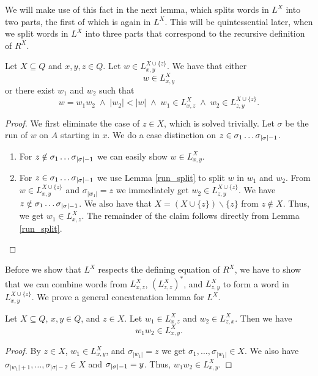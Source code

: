 
We will make use of this fact in the next lemma, which splits words in $L^{X}$ into two parts,
the first of which is again in $L^{X}$. 
This will be quintessential later, when we split words in $L^{X}$ into three parts 
that correspond to the recursive definition of $R^X$.

\begin{lemma}
    \label{L_split}
    Let $X \subseteq Q$ and $x,y,z \in Q$.
    Let $w \in L^{X\cup\{z\}}_{x,y}$.
    We have that either    
    \begin{equation*}
        w \in L^{X}_{x,y} 
    \end{equation*}
    or there exist $w_1$ and $w_2$ such that
    \begin{equation*}
        w = w_1 w_2 \; \wedge \; |w_2| < |w| \;
        \wedge \; w_1 \in L^X_{x,z} \; \wedge \; w_2 \in L^{X \cup \{z\}}_{z,y}.
    \end{equation*}
\end{lemma}
\begin{proof}
    We first eliminate the case of $z \in X$, which is solved trivially.
    Let $\sigma$ be the run of $w$ on $A$ starting in $x$.
    We do a case distinction on $z \in \sigma_1 \ldots {\sigma}_{|{\sigma}|-1}$.
    \begin{enumerate}
        \item For $z \notin \sigma_1 \ldots {\sigma}_{|{\sigma}|-1}$ we can easily show $w \in L^X_{x,y}$.
        \item 
            For $z \in \sigma_1 \ldots {\sigma}_{|{\sigma}|-1}$ we use Lemma \ref{run_split} to split $w$ in $w_1$ and $w_2$.
            From $w \in L^{X\cup\{z\}}_{x,y}$ and $\sigma_{|w_1|} = z$ we immediately get $w_2 \in L^{X\cup\{z\}}_{z,y}$.
            We have $z \notin \sigma_1 \ldots {\sigma}_{|{\sigma}|-1}$.
            We also have that $X = (X \cup \{z\})\backslash\{z\}$ from $z \notin X$.
            Thus, we get $w_1 \in L^{X}_{x,z}$. The remainder of the claim follows directly from Lemma \ref{run_split}.
    \end{enumerate}
\end{proof}

Before we show that $L^X$ respects the defining equation of $R^X$, 
we have to show that we can combine words from $L^{X}_{x,z}$, $(L^{X}_{z,z})^*$, and $L^{X}_{z,y}$ to form a word in $L^{X\cup\{z\}}_{x,y}$.
We prove a general concatenation lemma for $L^X$.

\begin{lemma}
    \label{L_cat}
    Let $X \subseteq Q$, $x,y\in Q$, and $z \in X$. 
    Let $w_1 \in L^X_{x,z}$ and $w_2 \in L^X_{z,x}$.
    Then we have
    \begin{equation*}
        w_1 w_2 \in L^X_{x,y}.
    \end{equation*}
\end{lemma}
\begin{proof}
    By $z \in X$, $w_1 \in L^X_{x,y}$, and $\sigma_{|w_1|} = z$ we get $\sigma_1, \ldots, \sigma_{|w_1|} \in X$.
    We also have $\sigma_{|w_1|+1}, \ldots, \sigma_{|\sigma|-2} \in X$ and ${\sigma}_{|{\sigma}|-1} = y$. Thus, $w_1 w_2 \in L^X_{x,y}$.
\end{proof}

